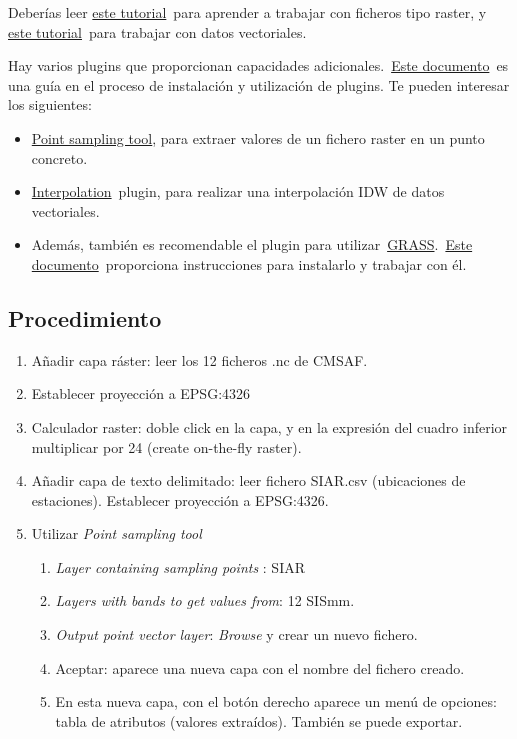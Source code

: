\documentclass[11pt]{article}
\begin{document}
Deberías
leer
\href{https://docs.qgis.org/3.22/es/docs/user\_manual/working\_with\_raster/index.html}{este
  tutorial} para aprender a trabajar con ficheros tipo raster,
y
\href{http://docs.qgis.org/3.22/es/docs/user\_manual/working\_with\_vector/index.html}{este
  tutorial} para trabajar con datos vectoriales.

Hay varios plugins que proporcionan capacidades
adicionales. \href{https://docs.qgis.org/3.22/es/docs/training\_manual/qgis\_plugins/fetching\_plugins.html}{Este
  documento} es una guía en el proceso de instalación y utilización de
plugins. Te pueden interesar los siguientes:

\begin{itemize}
\item \href{https://plugins.qgis.org/plugins/pointsamplingtool/}{Point
    sampling tool}, para extraer valores de un fichero raster en un
  punto concreto.
\item
  \href{https://docs.qgis.org/3.22/es/docs/user\_manual/plugins/plugins\_interpolation.html}{Interpolation} plugin,
  para realizar una interpolación IDW de datos vectoriales.
\item Además, también es recomendable el plugin para
  utilizar \href{https://grass.osgeo.org/}{GRASS}. \href{http://docs.qgis.org/3.22/es/docs/user\_manual/grass\_integration/grass\_integration.html}{Este
    documento} proporciona instrucciones para instalarlo y trabajar
  con él.
\end{itemize}

\subsection*{Procedimiento}
\label{sec:orge72c353}

\begin{enumerate}
\item Añadir capa ráster: leer los 12 ficheros .nc de CMSAF.
\item Establecer proyección a EPSG:4326
\item Calculador raster: doble click en la capa, y en la expresión del
  cuadro inferior multiplicar por 24 (create on-the-fly raster).
\item Añadir capa de texto delimitado: leer fichero SIAR.csv
  (ubicaciones de estaciones). Establecer proyección a EPSG:4326.
\item Utilizar \emph{Point sampling tool}
  \begin{enumerate}
  \item \emph{Layer containing sampling points} : SIAR
  \item \emph{Layers with bands to get values from}: 12 SISmm.
  \item \emph{Output point vector layer}: \emph{Browse} y crear un
    nuevo fichero.
  \item Aceptar: aparece una nueva capa con el nombre del fichero
    creado.
  \item En esta nueva capa, con el botón derecho aparece un menú de
    opciones: tabla de atributos (valores extraídos). También se puede
    exportar.
  \end{enumerate}
\end{enumerate}
\end{document}
